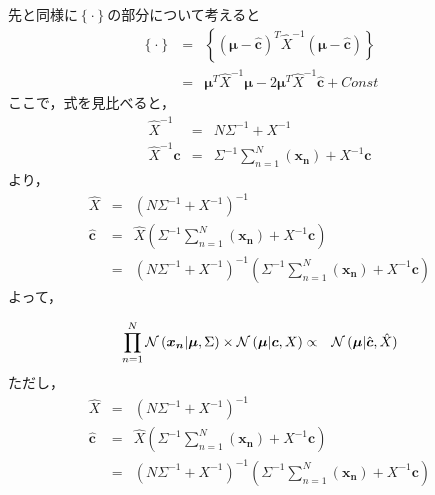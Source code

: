 \documentclass[a4j]{jarticle}
\begin{document}
先と同様に$\left\{\cdot\right\}$の部分について考えると
\begin{eqnarray}
\left\{\cdot\right\} &=& \left\{ \left( \boldsymbol{\mu} - \hat{\boldsymbol{c}}\right)^T \hat{X}^{-1} \left( \boldsymbol{\mu} - \hat{\boldsymbol{c}}\right) \right\} \\
&=&
\boldsymbol{\mu}^T \hat{X}^{-1}\boldsymbol{\mu} -2\boldsymbol{\mu}^T \hat{X}^{-1}\hat{\boldsymbol{c}} + Const
\end{eqnarray}
ここで，式を見比べると，
\begin{eqnarray}
\hat{X}^{-1} &=& N \Sigma^{-1} + X^{-1}\\
\hat{X}^{-1}\hat{\boldsymbol{c}} &=& \Sigma^{-1}\sum_{n=1}^{N}{(\boldsymbol{x_n})} + X^{-1}\boldsymbol{c}
\end{eqnarray}
より，
\begin{eqnarray}
\hat{X} &=& \left( N \Sigma^{-1} + X^{-1} \right)^{-1}\\
\hat{\boldsymbol{c}} &=& \hat{X}\left(\Sigma^{-1}\sum_{n=1}^{N}{(\boldsymbol{x_n})} + X^{-1}\boldsymbol{c} \right)\\
&=& \left( N \Sigma^{-1} + X^{-1} \right)^{-1} \left(\Sigma^{-1}\sum_{n=1}^{N}{(\boldsymbol{x_n})} + X^{-1}\boldsymbol{c} \right)
\end{eqnarray}
よって，
\begin{screen}
\begin{eqnarray}
\prod_{n=1}^{N}{\operatorname{\mathcal{N}}{(\boldsymbol{x_n} | \boldsymbol{\mu}, \Sigma)}}
\times
\operatorname{\mathcal{N}}{(\boldsymbol{\mu} | \boldsymbol{c}, X)}
&\propto&
\operatorname{\mathcal{N}}{(\boldsymbol{\mu} | \hat{\boldsymbol{c}}, \hat{X})}
\end{eqnarray}
ただし，
\begin{eqnarray}
\hat{X} &=& \left( N \Sigma^{-1} + X^{-1} \right)^{-1}\\
\hat{\boldsymbol{c}} &=& \hat{X}\left(\Sigma^{-1}\sum_{n=1}^{N}{(\boldsymbol{x_n})} + X^{-1}\boldsymbol{c} \right)\\
&=& \left( N \Sigma^{-1} + X^{-1} \right)^{-1} \left(\Sigma^{-1}\sum_{n=1}^{N}{(\boldsymbol{x_n})} + X^{-1}\boldsymbol{c} \right)
\end{eqnarray}
\end{screen}
\end{document}
